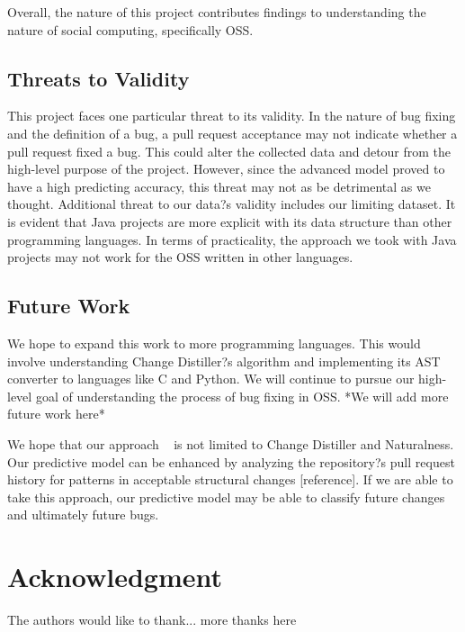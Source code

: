 \documentclass[10pt, conference]{IEEEtran}
\begin{document}
Overall, the nature of this project contributes findings to understanding the nature of social computing, specifically OSS. 

\subsection{Threats to Validity}
This project faces one particular threat to its validity. In the nature of bug fixing and the definition of a bug, a pull request acceptance may not indicate whether a pull request fixed a bug. This could alter the collected data and detour from the high-level purpose of the project. However, since the advanced model proved to have a high predicting accuracy, this threat may not as be detrimental as we thought. Additional threat to  our data?s validity includes our limiting dataset. It is evident that Java projects are more explicit with its data structure than other programming languages. In terms of practicality, the approach we took with Java projects may not work for the OSS written in other languages.

\subsection{Future Work}
We hope to expand this work to more programming languages. This would involve understanding Change Distiller?s algorithm and implementing its AST converter to languages like C and Python. We will continue to pursue our high-level goal of understanding the process of bug fixing in OSS. *We will add more future work here*

We hope that our approach ~\cite{Giachino:2014:CRD:2731750.2731754} is not limited to Change Distiller and Naturalness. Our predictive model can be enhanced by analyzing the repository?s pull request history for patterns in acceptable structural changes [reference]. If we are able to take this approach, our predictive model may be able to classify future changes and ultimately future bugs. ~\cite{Yu}

\section*{Acknowledgment}

The authors would like to thank...
more thanks here







\end{document}

